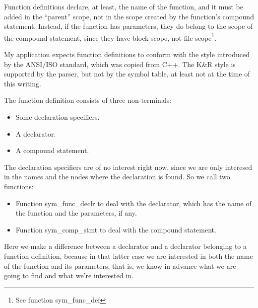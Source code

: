 \documentclass[a4paper,openany]{article}
\begin{document}
Function definitions declare, at least, the name of the function, and it must be added in the ``parent'' scope, not in the scope created by the function's compound statement. Instead, if the function has parameters, they do belong to the scope of the compound statement, since they have block scope, not file scope\footnote{See function sym\_func\_def}.

My application expects function definitions to conform with the style introduced by the ANSI/ISO standard, which was copied from C++. The K\&R style is supported by the parser, but not by the symbol table, at least not at the time of this writing.

The function definition consists of three non-terminals:

\begin{itemize}
\item Some declaration specifiers.

\item A declarator.

\item A compound statement.
\end{itemize}

The declaration specifiers are of no interest right now, since we are only interesed in the names and the nodes where the declaration is found. So we call two functions:

\begin{itemize}
\item Function sym\_func\_declr to deal with the declarator, which has the name of the function and the parameters, if any.

\item Function sym\_comp\_stmt to deal with the compound statement.
\end{itemize}

Here we make a difference between a declarator and a declarator belonging to a function definition, because in that latter case we are interested in both the name of the function and its parameters, that is, we know in advance what we are going to find and what we're interested in.
\end{document}
